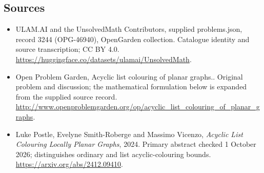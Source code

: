 \documentclass[11pt,a4paper]{article}
\begin{document}
\subsection{Sources}
\begin{itemize}
\item[S1] ULAM.AI and the UnsolvedMath Contributors, supplied problems.json, record 3244 (OPG-46940), OpenGarden collection. Catalogue identity and source transcription; CC BY 4.0.
\url{https://huggingface.co/datasets/ulamai/UnsolvedMath}.
\item[S2] Open Problem Garden, Acyclic list colouring of planar graphs.. Original problem and discussion; the mathematical formulation below is expanded from the supplied source record.
\url{http://www.openproblemgarden.org/op/acyclic_list_colouring_of_planar_graphs}.

\item[R1] Luke Postle, Evelyne Smith-Roberge and Massimo Vicenzo,
\emph{Acyclic List Colouring Locally Planar Graphs}, 2024. Primary
abstract checked 1 October 2026; distinguishes ordinary and list
acyclic-colouring bounds.
\url{https://arxiv.org/abs/2412.09410}.

\end{itemize}
\end{document}
